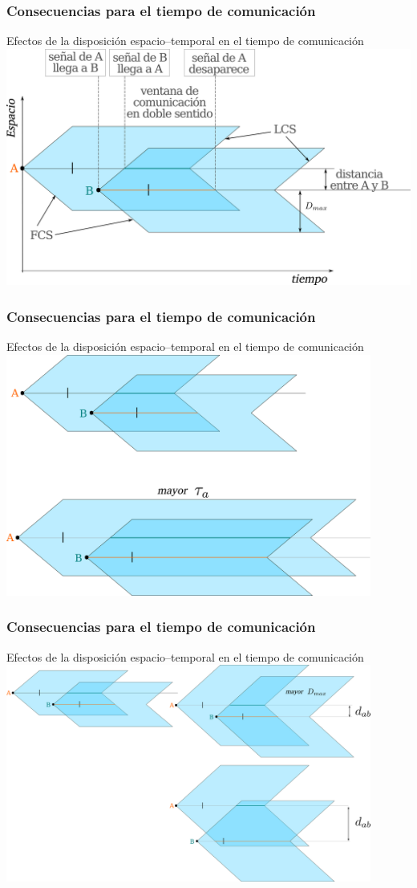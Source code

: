 \documentclass[handout]{beamer}
\theoremstyle{plain}
\theoremstyle{definition}
\theoremstyle{remark}
\begin{document}
\begin{frame}\frametitle{Consecuencias para el tiempo de comunicación}
Efectos de la disposición espacio--temporal en el tiempo de comunicación
\centering
\includegraphics[width=\textwidth]{text4616-5-8-3-4-2.png}
\end{frame}   %

\begin{frame}\frametitle{Consecuencias para el tiempo de comunicación}
Efectos de la disposición espacio--temporal en el tiempo de comunicación
\centering
\includegraphics[width=0.9\textwidth]{path9650-0.png}
\end{frame}   %

\begin{frame}\frametitle{Consecuencias para el tiempo de comunicación}
Efectos de la disposición espacio--temporal en el tiempo de comunicación
\centering
\includegraphics[width=0.9\textwidth]{g10765.png}
\end{frame}   %
\end{document}
